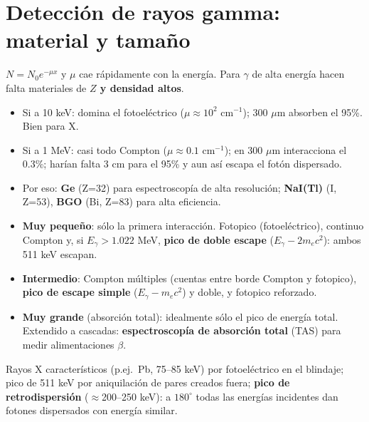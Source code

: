 \section{Detección de rayos gamma: material y tamaño}
\begin{clave}
$N=N_0e^{-\mu x}$ y $\mu$ cae rápidamente con la energía. Para $\gamma$ de alta energía hacen falta
materiales de \textbf{$Z$ y densidad altos}.
\begin{itemize}
\item Si a 10 keV: domina el fotoeléctrico ($\mu\approx10^2$ cm$^{-1}$); 300 $\mu$m absorben el 95\%. Bien para X.
\item Si a 1 MeV: casi todo Compton ($\mu\approx0.1$ cm$^{-1}$); en 300 $\mu$m interacciona el 0.3\%; harían falta 3 cm para el 95\% y aun así escapa el fotón dispersado.
\item Por eso: \textbf{Ge} (Z=32) para espectroscopía de alta resolución; \textbf{NaI(Tl)} (I, Z=53), \textbf{BGO} (Bi, Z=83) para alta eficiencia.
\end{itemize}
\end{clave}

\begin{clave}
\begin{itemize}
\item \textbf{Muy pequeño}: sólo la primera interacción. Fotopico (fotoeléctrico), continuo Compton y, si $E_\gamma>1.022$ MeV,
\textbf{pico de doble escape} ($E_\gamma-2m_ec^2$): ambos 511 keV escapan.
\item \textbf{Intermedio}: Compton múltiples (cuentas entre borde Compton y fotopico), \textbf{pico de escape simple}
($E_\gamma-m_ec^2$) y doble, y fotopico reforzado.
\item \textbf{Muy grande} (absorción total): idealmente sólo el pico de energía total. Extendido a cascadas: \textbf{espectroscopía
de absorción total} (TAS) para medir alimentaciones $\beta$.
\end{itemize}
\end{clave}

\begin{clave}
Rayos X característicos (p.ej.\ Pb, 75--85 keV) por fotoeléctrico en el blindaje; pico de 511 keV por aniquilación de pares
creados fuera; \textbf{pico de retrodispersión} ($\approx$200--250 keV): a $180^\circ$ todas las energías incidentes dan
fotones dispersados con energía similar.
\end{clave}

